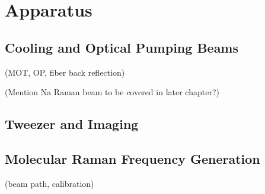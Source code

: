 
\chapter{Apparatus}
\label{ch:apparatus}

\section{Cooling and Optical Pumping Beams}
(MOT, OP, fiber back reflection)

(Mention Na Raman beam to be covered in later chapter?)

\section{Tweezer and Imaging}

\section{Molecular Raman Frequency Generation}
(beam path, calibration)
